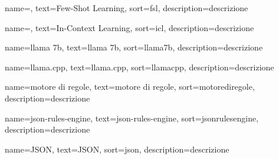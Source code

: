  {
    name=,
    text=Few-Shot Learning,
    sort=fsl,
    description={descrizione}
}

 {
    name=,
    text=In-Context Learning,
    sort=icl,
    description={descrizione}
}

 {
    name=llama 7b,
    text=llama 7b,
    sort=llama7b,
    description={descrizione}
}

 {
    name=llama.cpp,
    text=llama.cpp,
    sort=llamacpp,
    description={descrizione}
}

 {
    name=motore di regole,
    text=motore di regole,
    sort=motorediregole,
    description={descrizione}
}

 {
    name=json-rules-engine,
    text=json-rules-engine,
    sort=jsonrulesengine,
    description={descrizione}
}

 {
    name=JSON,
    text=JSON,
    sort=json,
    description={descrizione}
}